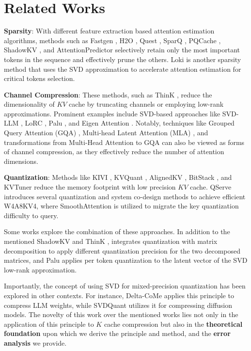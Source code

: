 \section{Related Works}
\label{sec:relatedworks}

\textbf{Sparsity}: With different feature extraction based attention estimation algorithms, methods such as Fastgen \citep{ge2023fastgen}, H2O \citep{zhang2024h2o}, Quest \citep{tang_quest_2024}, SparQ \citep{ribar_sparq_2024}, PQCache \citep{zhang2024pqcache}, ShadowKV \citep{sun_shadowkv_2024}, and AttentionPredictor \citep{yang2025attentionpredictor} selectively retain only the most important tokens in the sequence and effectively prune the others. Loki \cite{singhania_loki_2024} is another sparsity method that uses the SVD approximation to accelerate attention estimation for critical tokens selection.
 
\noindent \textbf{Channel Compression}: These methods, such as ThinK \citep{xu_think_2024}, reduce the dimensionality of $KV$ cache by truncating channels or employing low-rank approximations. Prominent examples include SVD-based approaches like SVD-LLM \citep{wang_svd-llm_2024}, LoRC \citep{zhang_lorc_2024}, Palu \citep{chang_palu_2024}, and Eigen Attention \cite{saxena_eigen_2024}. Notably, techniques like Grouped Query Attention (GQA) \cite{ainslie_gqa_2023}, Multi-head Latent Attention (MLA) \citep{deepseek-ai_deepseek-r1_2025}, and transformations from Multi-Head Attention to GQA \citep{jin_align_2024, chen_optimised_2024} can also be viewed as forms of channel compression, as they effectively reduce the number of attention dimensions.

\noindent \textbf{Quantization}: Methods like KIVI \citep{liu_kivi_2023}, KVQuant \cite{hooper2024kvquant}, AlignedKV \citep{tan_alignedkv_2024}, BitStack \cite{wang_bitstack_2024}, and KVTuner \citep{li2025kvtuner} reduce the memory footprint with low precision $KV$ cache. QServe \cite{lin_qserve_2024} introduces several quantization and system co-design methods to achieve efficient W4A8KV4, where SmoothAttention is utilized to migrate the key quantization difficulty to query.

Some works explore the combination of these approaches. In addition to the mentioned ShadowKV \citep{sun_shadowkv_2024} and ThinK \cite{xu_think_2024}, \cite{liu_unlocking_2024} integrates quantization with matrix decomposition to apply different quantization precision for the two decomposed matrices, and Palu \cite{chang_palu_2024} applies per token quantization to the latent vector of the SVD low-rank approximation.

Importantly, the concept of using SVD for mixed-precision quantization has been explored in other contexts. For instance, Delta-CoMe \citep{ping_delta-come_2024} applies this principle to compress LLM weights, while SVDQuant \citep{li_svdquant_2024} utilizes it for compressing diffusion models. The novelty of this work over the mentioned works lies not only in the application of this principle to $K$ cache compression but also in the \textbf{theoretical foundation} upon which we derive the principle and method, and the \textbf{error analysis} we provide.